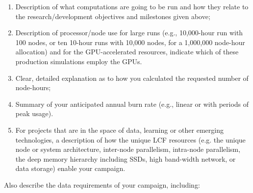\documentclass[11pt,letterpaper,english]{article}
\begin{document}
\begin{enumerate}[noitemsep,topsep=0pt]
\item Description of what computations are going to be run and how they relate to the research/development objectives and milestones given above;
\item Description of processor/node use for large runs (e.g., 10,000-hour run with 100 nodes, or ten 10-hour runs with 10,000 nodes, for a 1,000,000 node-hour allocation) and for the GPU-accelerated resources, indicate which of these production simulations employ the GPUs. 
\item Clear, detailed explanation as to how you calculated the requested number of node-hours;
\item Summary of your anticipated annual burn rate (e.g., linear or with periods of peak usage).  
\item For projects that are in the space of data, learning or other emerging technologies, a description of how the unique LCF resources (e.g. the unique node or system architecture, inter-node parallelism, intra-node parallelism, the deep memory hierarchy including SSDs, high band-width network, or data storage) enable your campaign.\\
\end{enumerate}

\vspace{.1in}
Also describe the data requirements of your campaign, including:
\end{document}
